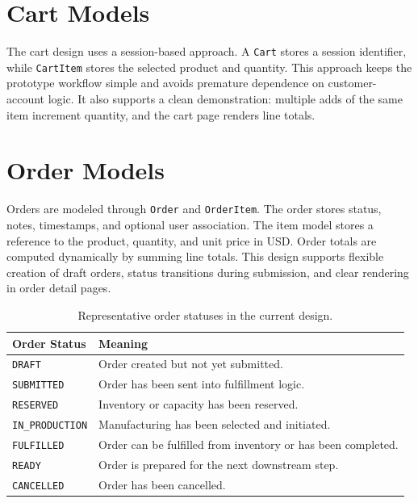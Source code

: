 \documentclass[12pt,letterpaper,oneside,openany]{book}
\begin{document}
\section{Cart Models}

\begin{justifying}
The cart design uses a session-based approach. A \texttt{Cart} stores a session
identifier, while \texttt{CartItem} stores the selected product and quantity.
This approach keeps the prototype workflow simple and avoids premature
dependence on customer-account logic. It also supports a clean demonstration:
multiple adds of the same item increment quantity, and the cart page renders
line totals.
\end{justifying}

\section{Order Models}

\begin{justifying}
Orders are modeled through \texttt{Order} and \texttt{OrderItem}. The order
stores status, notes, timestamps, and optional user association. The item model
stores a reference to the product, quantity, and unit price in USD. Order
totals are computed dynamically by summing line totals. This design supports
flexible creation of draft orders, status transitions during submission, and
clear rendering in order detail pages.
\end{justifying}

\begin{table}[H]
\centering
\begin{tabular}{|p{1.9in}|p{3.9in}|}
\hline
\textbf{Order Status} & \textbf{Meaning} \\ \hline
\texttt{DRAFT} & Order created but not yet submitted. \\ \hline
\texttt{SUBMITTED} & Order has been sent into fulfillment logic. \\ \hline
\texttt{RESERVED} & Inventory or capacity has been reserved. \\ \hline
\texttt{IN\_PRODUCTION} & Manufacturing has been selected and initiated. \\ \hline
\texttt{FULFILLED} & Order can be fulfilled from inventory or has been completed. \\ \hline
\texttt{READY} & Order is prepared for the next downstream step. \\ \hline
\texttt{CANCELLED} & Order has been cancelled. \\ \hline
\end{tabular}
\caption{Representative order statuses in the current design.}
\label{tab:order_statuses}
\end{table}
\end{document}
